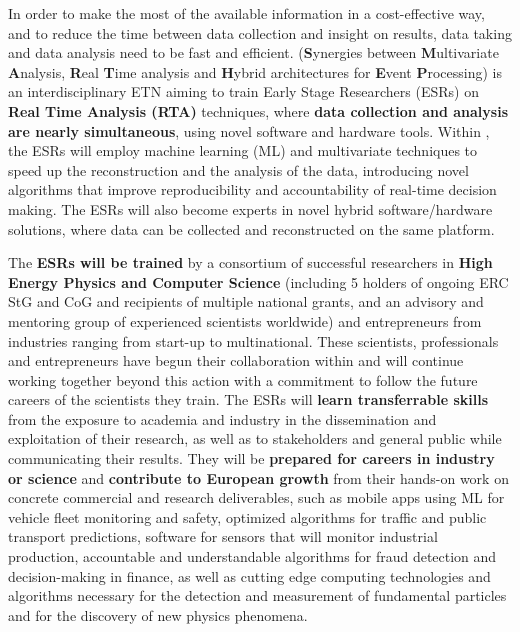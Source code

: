 In order to make the most of the available information in a cost-effective way, and to reduce the time between data collection and  insight on results, data taking and data analysis need to be fast and efficient. 
\acronym ({\color{blue}\textbf{S}}ynergies between {\color{blue}\textbf{M}}ultivariate {\color{blue}\textbf{A}}nalysis, {\color{blue}\textbf{R}}eal {\color{blue}\textbf{T}}ime analysis and {\color{blue}\textbf{H}}ybrid architectures for {\color{blue}\textbf{E}}vent {\color{blue}\textbf{P}}rocessing) is an interdisciplinary ETN aiming to train Early Stage Researchers (ESRs) on \textbf{Real Time Analysis (RTA)} techniques, where \textbf{data collection and analysis are nearly simultaneous}, using novel software and hardware tools. 
Within \acronym, the ESRs will employ machine learning (ML) and multivariate techniques to speed up the reconstruction and the analysis of the data, introducing novel algorithms that improve reproducibility and accountability of real-time decision making. 
The ESRs will also become experts in novel hybrid software/hardware solutions, where data can be collected and reconstructed on the same platform. 

The \acronym \textbf{ESRs will be trained} by a consortium of successful researchers in \textbf{High Energy Physics and Computer Science} (including 5 holders of ongoing ERC StG and CoG and recipients of multiple national grants, and an advisory and mentoring group of experienced scientists worldwide) and entrepreneurs from industries ranging from start-up to multinational. 
These scientists, professionals and entrepreneurs have begun their collaboration within \acronym and will continue working together beyond this action with a commitment to follow the future careers of the scientists they train. 
The ESRs will \textbf{learn transferrable skills} from the exposure to academia and industry in the dissemination and exploitation of their research, as well as to stakeholders and general public while communicating their results. 
They will be \textbf{prepared for careers in industry or science} and \textbf{contribute to European growth} from their hands-on work on concrete commercial and research deliverables, such as 
mobile apps using ML for vehicle fleet monitoring and safety, 
optimized algorithms for traffic and public transport predictions,
software for sensors that will monitor industrial production, 
accountable and understandable algorithms for fraud detection and decision-making in finance,
as well as cutting edge computing technologies and algorithms necessary for the detection and measurement of fundamental particles and for the discovery of new physics phenomena. 
